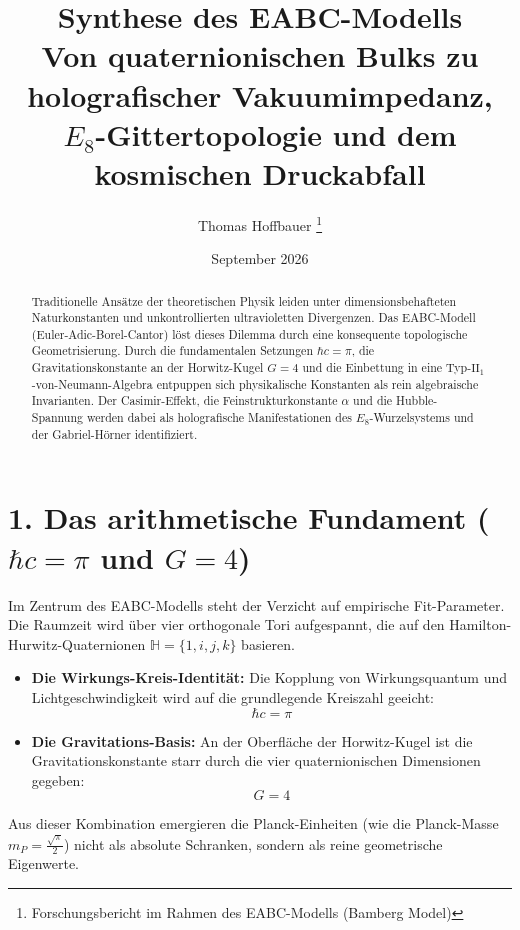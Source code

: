 \documentclass[11pt,a4paper]{article}
\title{\textbf{Synthese des EABC-Modells}\\ \large Von quaternionischen Bulks zu holografischer Vakuumimpedanz, $E_8$-Gittertopologie und dem kosmischen Druckabfall}
\author{Thomas Hoffbauer \thanks{Forschungsbericht im Rahmen des EABC-Modells (Bamberg Model)}}
\date{September 2026}
\begin{document}
\maketitle

\begin{abstract}
Traditionelle Ansätze der theoretischen Physik leiden unter dimensionsbehafteten Naturkonstanten und unkontrollierten ultravioletten Divergenzen. Das EABC-Modell (Euler-Adic-Borel-Cantor) löst dieses Dilemma durch eine konsequente topologische Geometrisierung. Durch die fundamentalen Setzungen $\hbar c = \pi$, die Gravitationskonstante an der Horwitz-Kugel $G = 4$ und die Einbettung in eine Typ-$\text{II}_1$-von-Neumann-Algebra entpuppen sich physikalische Konstanten als rein algebraische Invarianten. Der Casimir-Effekt, die Feinstrukturkonstante $\alpha$ und die Hubble-Spannung werden dabei als holografische Manifestationen des $E_8$-Wurzelsystems und der Gabriel-Hörner identifiziert.
\end{abstract}

\section{1. Das arithmetische Fundament ($\hbar c = \pi$ und $G = 4$)}
Im Zentrum des EABC-Modells steht der Verzicht auf empirische Fit-Parameter. Die Raumzeit wird über vier orthogonale Tori aufgespannt, die auf den Hamilton-Hurwitz-Quaternionen $\mathbb{H} = \{1, i, j, k\}$ basieren. 
\begin{itemize}
    \item \textbf{Die Wirkungs-Kreis-Identität:} Die Kopplung von Wirkungsquantum und Lichtgeschwindigkeit wird auf die grundlegende Kreiszahl geeicht:
    \begin{equation}
        \hbar c = \pi
    \end{equation}
    \item \textbf{Die Gravitations-Basis:} An der Oberfläche der Horwitz-Kugel ist die Gravitationskonstante starr durch die vier quaternionischen Dimensionen gegeben:
    \begin{equation}
        G = 4
    \end{equation}
\end{itemize}
Aus dieser Kombination emergieren die Planck-Einheiten (wie die Planck-Masse $m_P = \frac{\sqrt{\pi}}{2}$) nicht als absolute Schranken, sondern als reine geometrische Eigenwerte.
\end{document}
